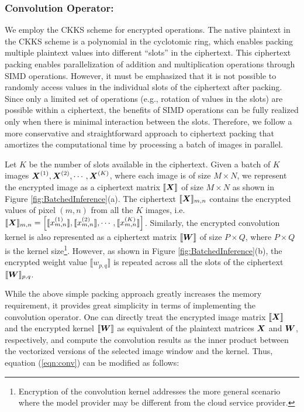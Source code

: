 \documentclass[letterpaper]{article} %
\newcommand{\vect}[1]{\mbox{\boldmath$#1$}}
\begin{document}
\subsubsection{Convolution Operator:}

We employ the CKKS scheme for encrypted operations. The native plaintext in the CKKS scheme is a polynomial in the cyclotomic ring, which enables packing multiple plaintext values into different ``slots'' in the ciphertext. This ciphertext packing enables parallelization of addition and multiplication operations through SIMD operations. However, it must be emphasized that it is not possible to randomly access values in the individual slots of the ciphertext after packing. Since only a limited set of operations (e.g., rotation of values in the slots) are possible within a ciphertext, the benefits of SIMD operations can be fully realized only when there is minimal interaction between the slots. Therefore, we follow a more conservative and straightforward approach to ciphertext packing that amortizes the computational time by processing a batch of images in parallel.

Let $K$ be the number of slots available in the ciphertext. Given a batch of $K$ images $\vect{X}^{(1)},\vect{X}^{(2)},\cdots,\vect{X}^{(K)}$, where each image is of size $M \times N$, we represent the encrypted image as a ciphertext matrix $\llbracket \vect{X} \rrbracket$ of size $M \times N$ as shown in Figure \ref{fig:BatchedInference}(a). The ciphertext $\llbracket \vect{X} \rrbracket_{m,n}$ contains the encrypted values of pixel $(m,n)$ from all the $K$ images, i.e. $\llbracket \vect{X} \rrbracket_{m,n} = \left[\llbracket x_{m,n}^{(1)} \rrbracket, \llbracket x_{m,n}^{(2)} \rrbracket, \cdots, \llbracket x_{m,n}^{(K)} \rrbracket\right]$. Similarly, the encrypted convolution kernel is also represented as a ciphertext matrix $\llbracket \vect{W} \rrbracket$ of size $P \times Q$, where $P \times Q$ is the kernel size\footnote{Encryption of the convolution kernel addresses the more general scenario where the model provider may be different from the cloud service provider.}. However, as shown in Figure \ref{fig:BatchedInference}(b), the encrypted weight value $\llbracket w_{p,q} \rrbracket$ is repeated across all the slots of the ciphertext $\llbracket \vect{W} \rrbracket_{p,q}$.

While the above simple packing approach greatly increases the memory requirement, it provides great simplicity in terms of implementing the convolution operator. One can directly treat the encrypted image matrix $\llbracket \vect{X} \rrbracket$ and the encrypted kernel $\llbracket \vect{W} \rrbracket$ as equivalent of the plaintext matrices $\vect{X}$ and $\vect{W}$, respectively, and compute the convolution results as the inner product between the vectorized versions of the selected image window and the kernel. Thus, equation (\ref{eqn:conv}) can be modified as follows:
\end{document}
